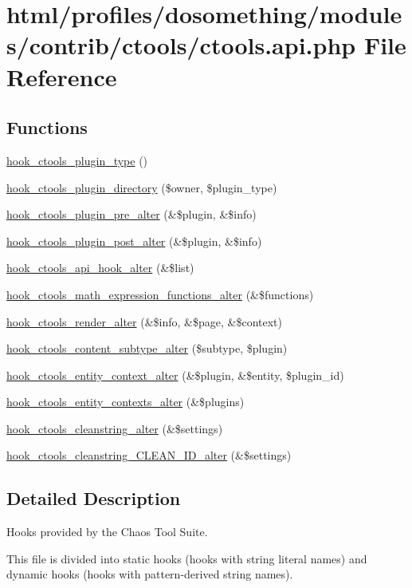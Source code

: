 \hypertarget{ctools_8api_8php}{
\section{html/profiles/dosomething/modules/contrib/ctools/ctools.api.php File Reference}
\label{ctools_8api_8php}
}
\subsection*{Functions}
\begin{DoxyCompactItemize}
\item 
\hyperlink{group__hooks_gacb27d27849a3374ddda0120603d549ac}{hook\_\-ctools\_\-plugin\_\-type} ()
\item 
\hyperlink{group__hooks_gaf17a0de7a7ca6e6c30c766ea1e44715e}{hook\_\-ctools\_\-plugin\_\-directory} (\$owner, \$plugin\_\-type)
\item 
\hyperlink{group__hooks_ga4ae530d112605c111f7bdead789ed91d}{hook\_\-ctools\_\-plugin\_\-pre\_\-alter} (\&\$plugin, \&\$info)
\item 
\hyperlink{group__hooks_ga2f8a7bad70a9bcb0748a13463a32d362}{hook\_\-ctools\_\-plugin\_\-post\_\-alter} (\&\$plugin, \&\$info)
\item 
\hyperlink{group__hooks_gad31fa7973a09a182d52fc1bda3bd95a0}{hook\_\-ctools\_\-api\_\-hook\_\-alter} (\&\$list)
\item 
\hyperlink{group__hooks_ga133fb5b53380291a3348feffb3dd3364}{hook\_\-ctools\_\-math\_\-expression\_\-functions\_\-alter} (\&\$functions)
\item 
\hyperlink{group__hooks_ga512e53c159fc6ea771d23b52d54b2f6a}{hook\_\-ctools\_\-render\_\-alter} (\&\$info, \&\$page, \&\$context)
\item 
\hyperlink{group__hooks_ga095e4e5a15a03861b5e708e3454bf154}{hook\_\-ctools\_\-content\_\-subtype\_\-alter} (\$subtype, \$plugin)
\item 
\hyperlink{group__hooks_gad8e0232b98d84d2347a3cc1e26c3df09}{hook\_\-ctools\_\-entity\_\-context\_\-alter} (\&\$plugin, \&\$entity, \$plugin\_\-id)
\item 
\hyperlink{group__hooks_gadc7f17dbf80ddbe90f66e7e9a0abb350}{hook\_\-ctools\_\-entity\_\-contexts\_\-alter} (\&\$plugins)
\item 
\hyperlink{group__hooks_ga8904abb33205b8553b560e08fd005e3a}{hook\_\-ctools\_\-cleanstring\_\-alter} (\&\$settings)
\item 
\hyperlink{group__hooks_gaa77de664d1ef915311e4f768eb6c62ea}{hook\_\-ctools\_\-cleanstring\_\-CLEAN\_\-ID\_\-alter} (\&\$settings)
\end{DoxyCompactItemize}


\subsection{Detailed Description}
Hooks provided by the Chaos Tool Suite.

This file is divided into static hooks (hooks with string literal names) and dynamic hooks (hooks with pattern-\/derived string names). 